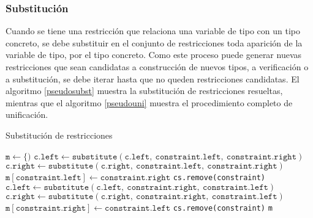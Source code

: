 \subsubsection{Substitución}
Cuando se tiene una restricción que relaciona una variable de tipo con un tipo concreto, se debe substituir en el conjunto de restricciones toda aparición de la variable de tipo, por el tipo concreto. Como este proceso puede generar nuevas restricciones que sean candidatas a construcción de nuevos tipos, a verificación o a substitución, se debe iterar hasta que no queden restricciones candidatas. El algoritmo \ref{pseudosubst} muestra la substitución de restricciones resueltas, mientras que el algoritmo \ref{pseudouni} muestra el procedimiento completo de unificación.
\begin{algorithm}\captionsetup{labelsep=newline}
  \centering
  \caption{Substitución de restricciones}
  \label{pseudosubst}
    \begin{algorithmic}[1]
          \State $\mathtt{m\gets \{)}$
                \State $\mathtt{c.left\gets substitute(c.left,\ constraint.left,\ constraint.right)}$
                \State $\mathtt{c.right\gets substitute(c.right,\ constraint.left,\ constraint.right)}$
              \EndFor
              \State $\mathtt{m[constraint.left]\gets constraint.right}$
              \State \texttt{cs.remove(constraint)}
            \EndIf
                \State $\mathtt{c.left\gets substitute(c.left,\ constraint.right,\ constraint.left)}$
                \State $\mathtt{c.right\gets substitute(c.right,\ constraint.right,\ constraint.left)}$
              \EndFor
              \State $\mathtt{m[constraint.right]\gets constraint.left}$
              \State \texttt{cs.remove(constraint)}
            \EndIf
          \EndFor
          \State \Return \texttt{m}
      \EndFunction
    \end{algorithmic}
\end{algorithm}

